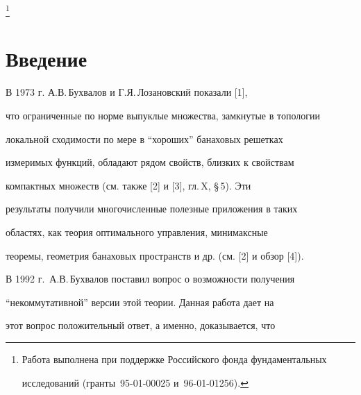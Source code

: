 \thanks{Работа выполнена при поддержке Российского фонда фундаментальных 


исследований (гранты \No\,95-01-00025 и \No\,96-01-01256).}


\date{}







\pagestyle{plain} %













\maketitle


\label{begin}





\section*{Введение}





В 1973 г. А.В.\,Бухвалов и Г.Я.\,Лозановский показали [1],


что ограниченные по норме выпуклые множества, замкнутые в топологии 


локальной сходимости по мере в ``хороших'' банаховых решетках 


измеримых функций, обладают рядом свойств, близких к свойствам 


компактных множеств (см. также [2] и [3], гл.\,X, \S\,5). Эти 


результаты получили многочисленные полезные приложения в таких 


областях, как теория оптимального управления, минимаксные 


теоремы, геометрия банаховых пространств и др. (см. [2] и обзор [4]). 


В 1992 г.~А.В.\,Бухвалов поставил вопрос о возможности получения 


``некоммутативной'' версии этой теории. Данная работа дает на 


этот вопрос положительный ответ, а именно, доказывается, что 


